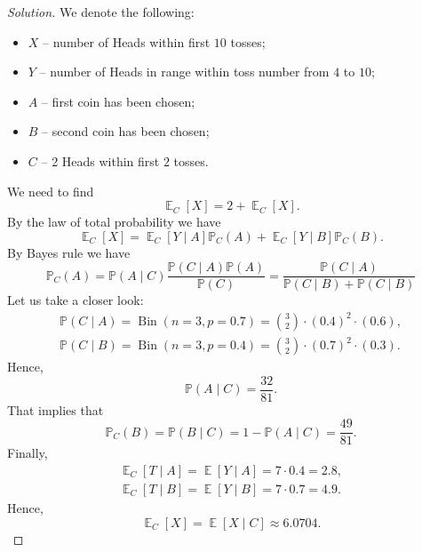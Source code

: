 \documentclass{article}[12pt]
\newenvironment{solution}
  {\renewcommand\qedsymbol{$\blacksquare$}\begin{proof}[Solution]}
  {\end{proof}}
\newenvironment{problem}[1]
  {\renewcommand\theinnercustomprblm{#1}\innercustomprblm}
  {\endinnercustomprblm}
\DeclareMathOperator{\Bin}{Bin}
\DeclareMathOperator{\E}{\mathbb{E}}
\renewcommand{\P}{\mathbb{P}}
\begin{document}
\begin{problem}{7.49}
\end{problem}
\begin{solution}
We denote the following:
\begin{itemize}
    \item $X$ -- number of Heads within first $10$ tosses;
    \item $Y$ -- number of Heads in range within toss number from $4$ to $10$;
    \item $A$ -- first coin has been chosen;
    \item $B$ -- second coin has been chosen;
    \item $C$ -- 2 Heads within first $2$ tosses.
\end{itemize}
We need to find
\begin{equation*}
    \E_{C}[X] = 2 + \E_{C}[X].
\end{equation*}
By the law of total probability we have
\begin{equation*}
    \E_{C}[X] = \E_{C}[Y\mid A]\P_{C}(A) +  \E_{C}[Y\mid B]\P_{C}(B).
\end{equation*}
By Bayes rule we have
\begin{equation*}
    \P_{C}(A) = \P(A\mid C)\frac{\P(C\mid A)\P(A)}{\P(C)} = \frac{\P(C\mid A)}{\P(C\mid B) + \P(C\mid B)}
\end{equation*}
Let us take a closer look:
\begin{gather*}
    \P(C\mid A) = \Bin(n = 3, p = 0.7) = \binom{3}{2}\cdot(0.4)^{2}\cdot(0.6),
    \\
    \P(C\mid B) = \Bin(n = 3, p = 0.4) = \binom{3}{2}\cdot(0.7)^{2}\cdot(0.3).
\end{gather*}
Hence,
\begin{equation*}
    \P(A\mid C) = \frac{32}{81}.
\end{equation*}
That implies that
\begin{equation*}
    \P_{C}(B) = \P(B\mid C) = 1 - \P(A\mid C) = \frac{49}{81}.
\end{equation*}
Finally,
\begin{gather*}
    \E_{C}[T\mid A] = \E[Y\mid A] = 7\cdot 0.4 = 2.8,
    \\
    \E_{C}[T\mid B] = \E[Y\mid B] = 7\cdot 0.7 = 4.9.
\end{gather*}
Hence,
\begin{equation*}
    \E_{C}[X] = \E[X\mid C] \approx 6.0704.
\end{equation*}
\end{solution}
\end{document}
